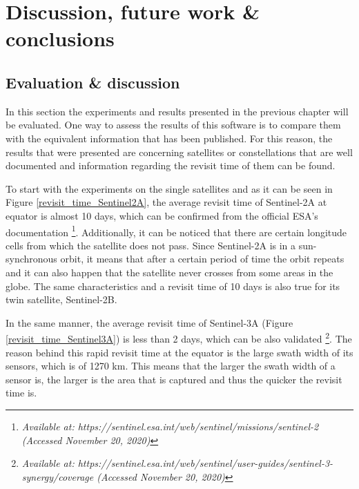 \chapter{Discussion, future work \& conclusions}
\label{chap:5}

\bigskip
\section{Evaluation \& discussion}
\bigskip

In this section the experiments and results presented in the previous chapter will be evaluated. One way to assess the results of this software is to compare them with the equivalent information that has been published. For this reason, the results that were presented are concerning satellites or constellations that are well documented and information regarding the revisit time of them can be found.

To start with the experiments on the single satellites and as it can be seen in Figure \ref{revisit_time_Sentinel2A}, the average revisit time of Sentinel-2A at equator is almost 10 days, which can be confirmed from the official ESA's documentation \footnote{\label{Sentinel2_source}\textit{Available at: https://sentinel.esa.int/web/sentinel/missions/sentinel-2 (Accessed November 20, 2020)}}. Additionally, it can be noticed that there are certain longitude cells from which the satellite does not pass. Since Sentinel-2A is in a sun-synchronous orbit, it means that after a certain period of time the orbit repeats and it can also happen that the satellite never crosses from some areas in the globe. The same characteristics and a revisit time of 10 days is also true for its twin satellite, Sentinel-2B.

\bigskip
In the same manner, the average revisit time of Sentinel-3A (Figure \ref{revisit_time_Sentinel3A}) is less than 2 days, which can be also validated \footnote{\label{Sentinel3A_source}\textit{Available at: https://sentinel.esa.int/web/sentinel/user-guides/sentinel-3-synergy/coverage (Accessed November 20, 2020)}}. The reason behind this rapid revisit time at the equator is the large swath width of its sensors, which is of 1270 km. This means that the larger the swath width of a sensor is, the larger is the area that is captured and thus the quicker the revisit time is.

